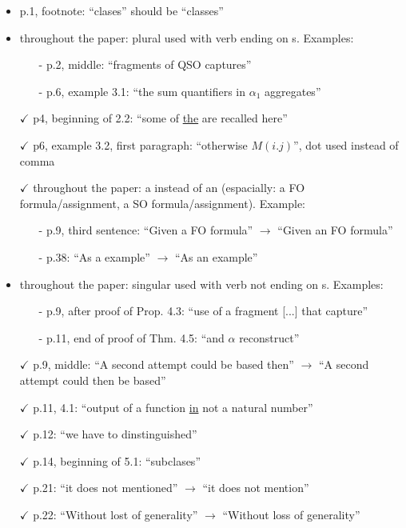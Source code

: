 \begin{itemize}
	\setlength\itemsep{0.5em}
	\item p.1, footnote: ``clases'' should be ``classes''
	\item throughout the paper: plural used with verb ending on s. Examples:
	\begin{itemize}
	\item[-] p.2, middle: ``fragments of QSO captures''
	\item[-] p.6, example 3.1: ``the sum quantifiers in $\alpha_1$ aggregates''
	\end{itemize}
	\item[$\checkmark$] p4, beginning of 2.2: ``some of \underline{the} are recalled here''
	\item[$\checkmark$] p6, example 3.2, first paragraph: ``otherwise $M(i.j)$'', dot used instead of comma
	\item[$\checkmark$] throughout the paper: a instead of an (espacially: a FO formula/assignment, a SO formula/assignment).
	Example:
	\begin{itemize}
		\item[-] p.9, third sentence: ``Given a FO formula'' $\to$ ``Given an FO formula''
	\item[-] p.38: ``As a example'' $\to$ ``As an example''
\end{itemize}
	\item throughout the paper: singular used with verb not ending on s. Examples:
	\begin{itemize}
	\item[-] p.9, after proof of Prop. 4.3: ``use of a fragment [...] that capture''
	\item[-] p.11, end of proof of Thm. 4.5: ``and $\alpha$ reconstruct''
\end{itemize}
	\item[$\checkmark$] p.9, middle: ``A second attempt could be based then'' $\to$ ``A second attempt could then be
	based''
	\item[$\checkmark$] p.11, 4.1: ``output of a function \underline{in} not a natural number''
	\item[$\checkmark$] p.12: ``we have to dinstinguished''
	\item[$\checkmark$] p.14, beginning of 5.1: ``subclases''
	\item[$\checkmark$] p.21: ``it does not mentioned'' $\to$ ``it does not mention''
	\item[$\checkmark$] p.22: ``Without lost of generality'' $\to$ ``Without loss of generality''

\end{itemize}
